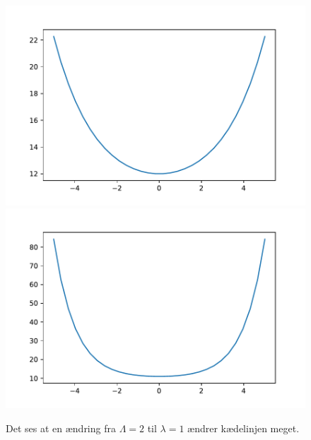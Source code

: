 \begin{figure}[h!]
\includegraphics[scale=0.5]{code/fig3}
\includegraphics[scale=0.5]{code/fig4}
\caption{Det ses at en ændring fra $\Lambda=2$ til $\lambda=1$ ændrer kædelinjen meget.}
\end{figure}
%